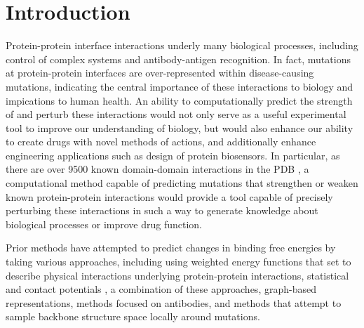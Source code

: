 \section{Introduction}

Protein-protein interface interactions underly many biological processes, including control of complex systems and antibody-antigen recognition.
In fact, mutations at protein-protein interfaces are over-represented within disease-causing mutations\cite{jubb_mutations_2017}, indicating the central importance of these interactions to biology and impications to human health.
An ability to computationally predict the strength of and perturb these interactions would not only serve as a useful experimental tool to improve our understanding of biology, but would also enhance our ability to create drugs with novel methods of actions, and additionally enhance engineering applications such as design of protein biosensors.
In particular, as there are over 9500 known domain-domain interactions in the PDB \cite{finn_ipfam:_2014}, a computational method capable of predicting mutations that strengthen or weaken known protein-protein interactions would provide a tool capable of precisely perturbing these interactions in such a way to generate knowledge about biological processes or improve drug function.


Prior methods have attempted to predict changes in binding free energies by taking various approaches,
including using weighted energy functions that set to describe physical interactions underlying protein-protein interactions\cite{guerois_predicting_2002,kamisetty_accounting_2011},
statistical and contact potentials \cite{dehouck_beatmusic:_2013,moal_intermolecular_2013,vangone_contacts-based_2015,brender_prediction_2015},
a combination of these approaches\cite{li_predicting_2014},
graph-based representations\cite{pires_mcsm:_2014},
methods focused on antibodies\cite{lippow_computational_2007},
and methods that attempt to sample backbone structure space locally around mutations\cite{dourado_multiscale_2014}.

